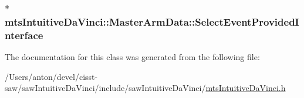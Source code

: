 \subsubsection[{Select\+Event\+Provided\+Interface}]{$\ast$ mts\+Intuitive\+Da\+Vinci\+::\+Master\+Arm\+Data\+::\+Select\+Event\+Provided\+Interface}\label{classmts_intuitive_da_vinci_1_1_master_arm_data_ae0abfe69ca750c526f1e4b86bba2ac93}


The documentation for this class was generated from the following file\+:\begin{DoxyCompactItemize}
\item 
/\+Users/anton/devel/cisst-\/saw/saw\+Intuitive\+Da\+Vinci/include/saw\+Intuitive\+Da\+Vinci/\hyperlink{mts_intuitive_da_vinci_8h}{mts\+Intuitive\+Da\+Vinci.\+h}\end{DoxyCompactItemize}
